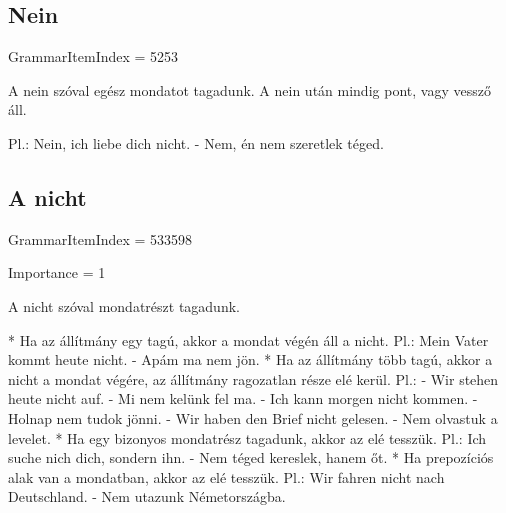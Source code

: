 \documentclass{article}
\newenvironment{desc}{\verbatim}{\endverbatim}
\begin{document}
\subsection{Nein}

GrammarItemIndex = 5253

\begin{desc}
A nein szóval egész mondatot tagadunk. A nein után mindig pont, vagy vessző áll.

Pl.: Nein, ich liebe dich nicht. - Nem, én nem szeretlek téged.
\end{desc}

\subsection{A nicht}

GrammarItemIndex = 533598

Importance = 1

\begin{desc}
A nicht szóval mondatrészt tagadunk.

* Ha az állítmány egy tagú, akkor a mondat végén áll a nicht.
  Pl.: Mein Vater kommt heute nicht. - Apám ma nem jön.
* Ha az állítmány több tagú, akkor a nicht a mondat végére, az állítmány ragozatlan része elé kerül.
  Pl.: - Wir stehen heute nicht auf. - Mi nem kelünk fel ma.
       - Ich kann morgen nicht kommen. - Holnap nem tudok jönni.
       - Wir haben den Brief nicht gelesen. - Nem olvastuk a levelet.
* Ha egy bizonyos mondatrész tagadunk, akkor az elé tesszük.
  Pl.: Ich suche nich dich, sondern ihn. - Nem téged kereslek, hanem őt.
* Ha prepozíciós alak van a mondatban, akkor az elé tesszük.
  Pl.: Wir fahren nicht nach Deutschland. - Nem utazunk Németországba.
\end{desc}
\end{document}
